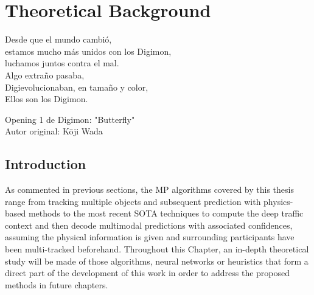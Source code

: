 % 
% 
% 
% 
% 
% 
% 

\chapter{Theoretical Background}
\label{cha:theoretical_background}

\begin{FraseCelebre}
	\begin{Frase}
		Desde que el mundo cambió, \\
		estamos mucho más unidos con los Digimon, \\
		luchamos juntos contra el mal. \\ 

		Algo extraño pasaba, \\
		Digievolucionaban, en tamaño y color, \\
		Ellos son los Digimon. \\
	\end{Frase}
	\begin{Fuente}
		Opening 1 de Digimon: "Butterfly" \\
		Autor original: Kōji Wada
	\end{Fuente}
\end{FraseCelebre}

\section{Introduction}
\label{sec:3_introduction}

As commented in previous sections, the \ac{MP} algorithms covered by this thesis range from tracking multiple objects and subsequent prediction with physics-based methods to the most recent \ac{SOTA} techniques to compute the deep traffic context and then decode multimodal predictions with associated confidences, assuming the physical information is given and surrounding participants have been multi-tracked beforehand. Throughout this Chapter, an in-depth theoretical study will be made of those algorithms, neural networks or heuristics that form a direct part of the development of this work in order to address the proposed methods in future chapters.

